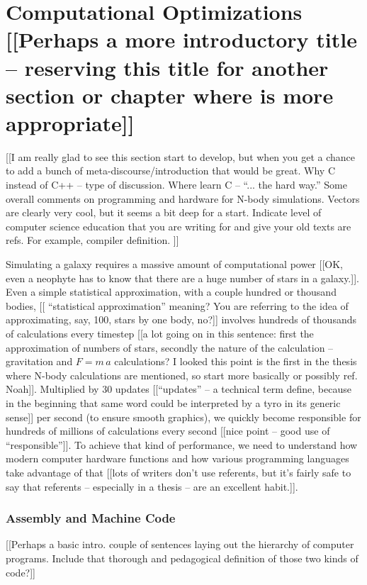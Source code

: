 \documentclass[thesis.tex]{subfiles}
\begin{document}
\chapter{Computational Optimizations [[Perhaps a more introductory title -- reserving this title for another section or chapter where is more appropriate]]}

[[I am really glad to see this section start to develop, but when you get a chance to add a bunch of meta-discourse/introduction that would be great.  Why C instead of C++ -- type of discussion. Where learn C -- ``... the hard way.''  Some overall  comments on programming and hardware for N-body simulations.  Vectors are clearly very cool, but it seems a bit deep for a start. Indicate level of computer science education that you are writing for and give your old texts are refs. For example, compiler definition.  ]]

Simulating a galaxy requires a massive amount of computational power [[OK, even a neophyte has to know that there are a huge number of stars in a galaxy.]]. Even a simple statistical approximation, with a couple hundred or thousand bodies, [[ ``statistical approximation''  meaning? You are referring to the idea of approximating, say, 100, stars by one body, no?]] involves hundreds of thousands of calculations every timestep [[a lot going on in this sentence: first the approximation of numbers of stars, secondly the nature of the calculation -- gravitation and $F = m \, a$ calculations?  I looked this point is the first in the thesis where N-body calculations are mentioned, so start more basically or possibly ref. Noah]]. Multiplied by 30 updates [[``updates'' -- a technical term define, because in the beginning that same word could be interpreted by a tyro in its generic sense]] per second (to ensure smooth graphics), we quickly become responsible for hundreds of millions of calculations every second [[nice point -- good use of ``responsible'']]. To achieve that kind of performance, we need to understand how modern computer hardware functions and how various programming languages take advantage of that [[lots of writers don't use referents, but it's fairly safe to say that referents -- especially in a thesis -- are an excellent habit.]].

\subsection{Assembly and Machine Code}

[[Perhaps a basic intro. couple of sentences laying out the hierarchy of computer programs.  Include that thorough and pedagogical definition of those two kinds of code?]]
\end{document}
